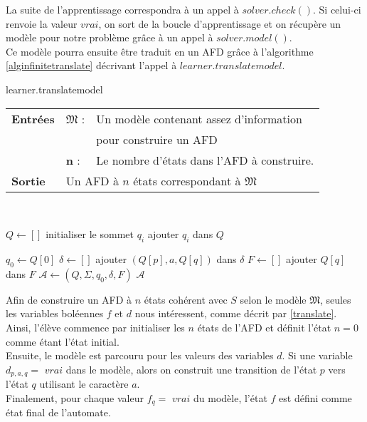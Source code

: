 \documentclass[12pt,a4paper,oneside,titlepage]{report}
\begin{document}
La suite de l'apprentissage correspondra à un appel à $solver.check()$. Si celui-ci renvoie la valeur $vrai$, on sort de la boucle d'apprentissage et on récupère un modèle pour notre problème grâce à un appel à $solver.model()$.\\

\noindent Ce modèle pourra ensuite être traduit en un AFD grâce à l'algorithme \ref{alginfinitetranslate} décrivant l'appel à $learner.translatemodel$.

\begin{algorithm}[H]
\caption{learner.translatemodel}\label{alginfinitetranslate}
\hspace*{\algorithmicindent} 
\begin{tabular}{lll}
	\textbf{Entrées} & \textbf{$\mathfrak{M}$} : &Un modèle contenant assez d'information\\
	&&pour construire un AFD\\
	&\textbf{n} :&Le nombre d'états dans l'AFD à construire.\\
	\textbf{Sortie} &\multicolumn{2}{l}{Un AFD à $n$ états correspondant à $\mathfrak{M}$}\\
\end{tabular}\\
\begin{algorithmic}[1]
\State $Q\gets[]$
	\State initialiser le sommet $q_i$
	\State ajouter $q_i$ dans $Q$
\EndFor
{}
\end{algorithmic}
\end{algorithm}

\begin{algorithm}[H]
\begin{algorithmic}[1]
\State $q_0\gets Q[0]$
\State $\delta\gets[]$
		\State ajouter $(Q[p],a,Q[q])$ dans $\delta$
	\EndIf
\EndFor
\State $F\gets[]$
		\State ajouter $Q[q]$ dans $F$
	\EndIf
\EndFor
\State $\mathcal{A}\gets(Q,\Sigma,q_0,\delta,F)$
\State\Return $\mathcal{A}$
\end{algorithmic}
\end{algorithm}
\noindent Afin de construire un AFD à $n$ états cohérent avec $S$ selon le modèle $\mathfrak{M}$, seules les variables boléennes $f$ et $d$ nous intéressent, comme décrit par \ref{translate}. Ainsi, l'élève commence par initialiser les $n$ états de l'AFD et définit l'état $n=0$ comme étant l'état initial.\\
Ensuite, le modèle est parcouru pour les valeurs des variables $d$. Si une variable $d_{p,a,q}=$ $vrai$ dans le modèle, alors on construit une transition de l'état $p$ vers l'état $q$ utilisant le caractère $a$.\\
Finalement, pour chaque valeur $f_{q}=$ $vrai$ du modèle, l'état $f$ est défini comme état final de l'automate.\\
\end{document}
